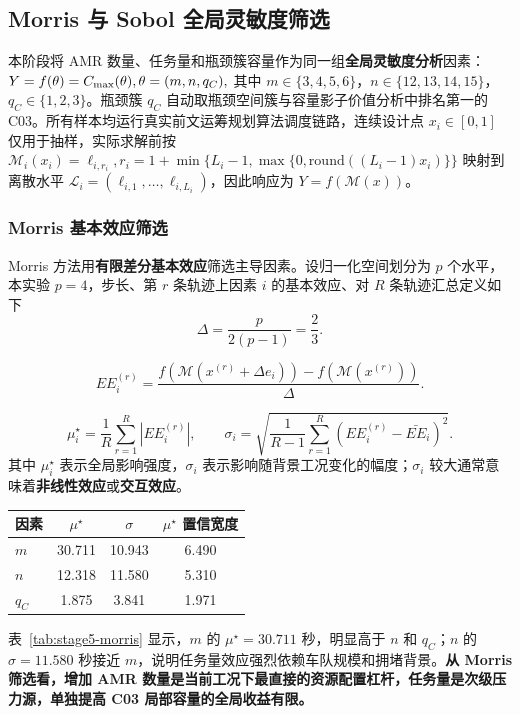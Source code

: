 \subsection{Morris 与 Sobol 全局灵敏度筛选}

本阶段将 AMR 数量、任务量和瓶颈簇容量作为同一组\textbf{全局灵敏度分析}因素：$Y=f(\theta)=C_{\max}(\theta),\theta=(m,n,q_C),$
其中 $m\in\{3,4,5,6\}$，$n\in\{12,13,14,15\}$，$q_C\in\{1,2,3\}$。瓶颈簇 $q_C$ 自动取瓶颈空间簇与容量影子价值分析中排名第一的 C03。所有样本均运行真实前文运筹规划算法调度链路，连续设计点 $x_i\in[0,1]$ 仅用于抽样，实际求解前按
$
\mathcal{M}_i(x_i)=\ell_{i,r_i},
r_i=1+\min\{L_i-1,\max\{0,\mathrm{round}((L_i-1)x_i)\}\}
$
映射到离散水平 $\mathcal{L}_i=(\ell_{i,1},\ldots,\ell_{i,L_i})$，因此响应为 $Y=f(\mathcal{M}(x))$。

\subsubsection{Morris 基本效应筛选}

Morris 方法用\textbf{有限差分基本效应}筛选主导因素。设归一化空间划分为 $p$ 个水平，本实验 $p=4$，步长、第 $r$ 条轨迹上因素 $i$ 的基本效应、对 $R$ 条轨迹汇总定义如下
\[
\Delta=\frac{p}{2(p-1)}=\frac{2}{3}.
\]

\[
EE_i^{(r)}
=\frac{f(\mathcal{M}(x^{(r)}+\Delta e_i))-f(\mathcal{M}(x^{(r)}))}{\Delta}.
\]

\[
\mu_i^\star=\frac{1}{R}\sum_{r=1}^{R}|EE_i^{(r)}|,\qquad
\sigma_i=\sqrt{\frac{1}{R-1}\sum_{r=1}^{R}\left(EE_i^{(r)}-\bar{EE}_i\right)^2}.
\]
其中 $\mu_i^\star$ 表示全局影响强度，$\sigma_i$ 表示影响随背景工况变化的幅度；$\sigma_i$ 较大通常意味着\textbf{非线性效应}或\textbf{交互效应}。

\begin{center}
\small
{}
\label{tab:stage5-morris}
\begin{tabular}{@{}lccc@{}}
\toprule
因素 & $\mu^\star$ & $\sigma$ & $\mu^\star$ 置信宽度 \\
\midrule
$m$ & 30.711 & 10.943 & 6.490 \\
$n$ & 12.318 & 11.580 & 5.310 \\
$q_C$ & 1.875 & 3.841 & 1.971 \\
\bottomrule
\end{tabular}
\end{center}

表~\ref{tab:stage5-morris} 显示，$m$ 的 $\mu^\star=30.711$ 秒，明显高于 $n$ 和 $q_C$；$n$ 的 $\sigma=11.580$ 秒接近 $m$，说明任务量效应强烈依赖车队规模和拥堵背景。\textbf{从 Morris 筛选看，增加 AMR 数量是当前工况下最直接的资源配置杠杆，任务量是次级压力源，单独提高 C03 局部容量的全局收益有限。}

